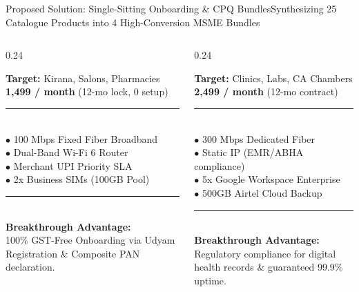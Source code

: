 \documentclass[aspectratio=169,10pt]{beamer}
\newcommand{\inr}{\text{Rs.\ }}
\begin{document}
\begin{frame}{Proposed Solution: Single-Sitting Onboarding \& CPQ Bundles}{Synthesizing 25 Catalogue Products into 4 High-Conversion MSME Bundles}
  \begin{columns}[T]
    \begin{column}{0.24\textwidth}
      \begin{tcolorbox}[academicbox, title={\fontsize{5.5pt}{6.6pt}\selectfont\textbf{Udyam Vyapar Pack}}, coltitle=charcoal]
        {\fontsize{4.6pt}{5.5pt}\selectfont
        \textbf{Target:} Kirana, Salons, Pharmacies \\
        \textbf{\inr 1,499 / month} (12-mo lock, \inr 0 setup) \\
        \textcolor{bordergray}{\rule{\linewidth}{0.25pt}} \\
        $\bullet$ 100 Mbps Fixed Fiber Broadband \\
        $\bullet$ Dual-Band Wi-Fi 6 Router \\
        $\bullet$ Merchant UPI Priority SLA \\
        $\bullet$ 2x Business SIMs (100GB Pool) \\
        \textcolor{bordergray}{\rule{\linewidth}{0.25pt}} \\
        \textbf{Breakthrough Advantage:} \\
        100\% GST-Free Onboarding via Udyam Registration \& Composite PAN declaration.
        }
      \end{tcolorbox}
    \end{column}

    \begin{column}{0.24\textwidth}
      \begin{tcolorbox}[academicbox, title={\fontsize{5.5pt}{6.6pt}\selectfont\textbf{Udyam Professional}}, coltitle=charcoal]
        {\fontsize{4.6pt}{5.5pt}\selectfont
        \textbf{Target:} Clinics, Labs, CA Chambers \\
        \textbf{\inr 2,499 / month} (12-mo contract) \\
        \textcolor{bordergray}{\rule{\linewidth}{0.25pt}} \\
        $\bullet$ 300 Mbps Dedicated Fiber \\
        $\bullet$ Static IP (EMR/ABHA compliance) \\
        $\bullet$ 5x Google Workspace Enterprise \\
        $\bullet$ 500GB Airtel Cloud Backup \\
        \textcolor{bordergray}{\rule{\linewidth}{0.25pt}} \\
        \textbf{Breakthrough Advantage:} \\
        Regulatory compliance for digital health records \& guaranteed 99.9\% uptime.
        }
      \end{tcolorbox}
    \end{column}


\end{columns}
\end{frame}
\end{document}
